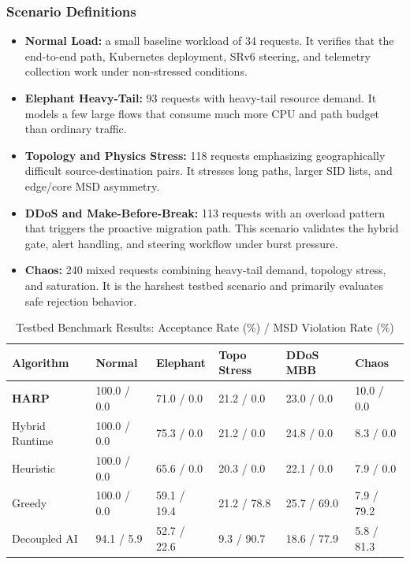 \documentclass[12pt, a4paper, reqno, oneside]{book}
\begin{document}
\subsubsection{Scenario Definitions}

\begin{itemize}
    \item \textbf{Normal Load:} a small baseline workload of 34 requests. It verifies that the end-to-end path, Kubernetes deployment, SRv6 steering, and telemetry collection work under non-stressed conditions.
    \item \textbf{Elephant Heavy-Tail:} 93 requests with heavy-tail resource demand. It models a few large flows that consume much more CPU and path budget than ordinary traffic.
    \item \textbf{Topology and Physics Stress:} 118 requests emphasizing geographically difficult source-destination pairs. It stresses long paths, larger SID lists, and edge/core MSD asymmetry.
    \item \textbf{DDoS and Make-Before-Break:} 113 requests with an overload pattern that triggers the proactive migration path. This scenario validates the hybrid gate, alert handling, and steering workflow under burst pressure.
    \item \textbf{Chaos:} 240 mixed requests combining heavy-tail demand, topology stress, and saturation. It is the harshest testbed scenario and primarily evaluates safe rejection behavior.
\end{itemize}

\begin{table}[H]
\centering
\caption{Testbed Benchmark Results: Acceptance Rate (\%) / MSD Violation Rate (\%)}
\label{table:testbed_scenarios}
\renewcommand{\arraystretch}{1.15}
\small
\begin{tabular}{l C{1.8cm} C{1.8cm} C{1.8cm} C{1.8cm} C{1.8cm}}
\toprule
\textbf{Algorithm} & \textbf{Normal} & \textbf{Elephant} & \textbf{Topo Stress} & \textbf{DDoS MBB} & \textbf{Chaos} \\
\midrule
\textbf{HARP}  & 100.0 / 0.0 & 71.0 / 0.0 & 21.2 / 0.0 & 23.0 / 0.0 & 10.0 / 0.0 \\
Hybrid Runtime    & 100.0 / 0.0 & 75.3 / 0.0 & 21.2 / 0.0 & 24.8 / 0.0 & 8.3 / 0.0 \\
Heuristic         & 100.0 / 0.0 & 65.6 / 0.0 & 20.3 / 0.0 & 22.1 / 0.0 & 7.9 / 0.0 \\
Greedy            & 100.0 / 0.0 & 59.1 / 19.4 & 21.2 / 78.8 & 25.7 / 69.0 & 7.9 / 79.2 \\
Decoupled AI      & 94.1 / 5.9  & 52.7 / 22.6 & 9.3 / 90.7  & 18.6 / 77.9 & 5.8 / 81.3 \\
\bottomrule
\end{tabular}
\end{table}
\end{document}
